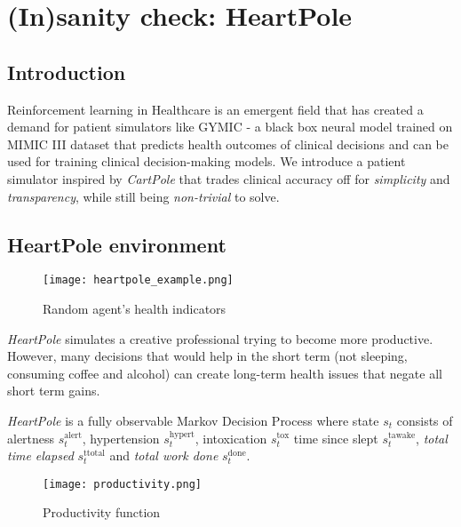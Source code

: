 \chapter{(In)sanity check: HeartPole}
\label{ch:heartpole}



\section{Introduction}
\label{sec:heartpole-introduction}

Reinforcement learning in Healthcare is an emergent field that has created a demand for patient simulators like GYMIC \cite{gymic} - a black box neural model trained on MIMIC III dataset \cite{mimic} that predicts health outcomes of clinical decisions and can be used for training clinical decision-making models. We introduce a patient simulator inspired by \emph{CartPole} \cite{cartpole} that trades clinical accuracy off for \emph{simplicity} and \emph{transparency}, while still being \emph{non-trivial} to solve.

\section{HeartPole environment}
\label{sec:heartpole-methodology}

\begin{figure}[H]
    \centering
    \texttt{[image: heartpole\_example.png]}
    \caption{Random agent's health indicators}
    \label{fig:random}
\end{figure}

\emph{HeartPole} simulates a creative professional trying to become more productive.
However, many decisions that would help in the short term (not sleeping, consuming coffee and alcohol) can create long-term health issues that negate all short term gains.

\emph{HeartPole} is a fully observable Markov Decision Process \cite{mdp} where state $s_t$ consists of alertness $s^\text{alert}_t$, hypertension $s^\text{hypert}_t$, intoxication $s^\text{tox}_t$ time since slept $s^\text{tawake}_t$, \emph{total time elapsed} $s^\text{ttotal}_t$ and \emph{total work done} $s^\text{done}_t$.

\begin{figure}[H]
    \centering
    \texttt{[image: productivity.png]}
    \caption{Productivity function}
    \label{fig:productivity}
\end{figure}

